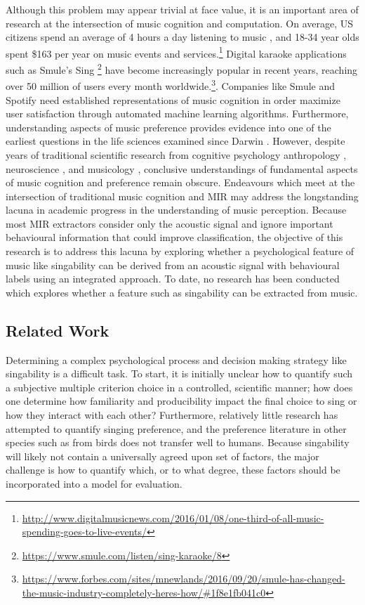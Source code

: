 Although this problem may appear trivial at face value, it is an important area of research at the intersection of music cognition and computation. On average, US citizens spend an average of 4 hours a day listening to music \cite{webster2015share}, and 18-34 year olds spent \$163 per year on music events and services.\footnote{\url{http://www.digitalmusicnews.com/2016/01/08/one-third-of-all-music-spending-goes-to-live-events/}} Digital karaoke applications such as Smule's Sing \footnote{\url{https://www.smule.com/listen/sing-karaoke/8}} have become increasingly popular in recent years, reaching over 50 million of users every month worldwide.\footnote{\url{https://www.forbes.com/sites/mnewlands/2016/09/20/smule-has-changed-the-music-industry-completely-heres-how/\#1f8e1fb041c0}}. Companies like Smule and Spotify need established representations of music cognition in order maximize user satisfaction through automated machine learning algorithms. Furthermore, understanding aspects of music preference provides evidence into one of the earliest questions in the life sciences examined since Darwin \cite{darwin1871descent,darwin1883descent}. However, despite years of traditional scientific research from cognitive psychology \cite{pinker1999mind,huron2001music,cross2012music} anthropology \cite{mithen2006singing,patel2003language}, neuroscience \cite{peretz2005brain}, and musicology \cite{wallin2001origins}, conclusive understandings of fundamental aspects of music cognition and preference remain obscure. Endeavours which meet at the intersection of traditional music cognition and MIR may address the longstanding lacuna in academic progress in the understanding of music perception. Because most MIR extractors consider only the acoustic signal and ignore important behavioural information that could improve classification, the objective of this research is to address this lacuna by exploring whether a psychological feature of music like singability can be derived from an acoustic signal with behavioural labels using an integrated approach. To date, no research has been conducted which explores whether a feature such as singability can be extracted from music.

\subsection{Related Work}\label{sec:related}
Determining a complex psychological process and decision making strategy like singability is a difficult task. To start, it is initially unclear how to quantify such a subjective multiple criterion choice in a controlled, scientific manner; how does one determine how familiarity and producibility impact the final choice to sing or how they interact with each other? Furthermore, relatively little research has attempted to quantify singing preference, and the preference literature in other species such as from birds does not transfer well to humans. Because singability will likely not contain a universally agreed upon set of factors, the major challenge is how to quantify which, or to what degree, these factors should be incorporated into a model for evaluation. 

